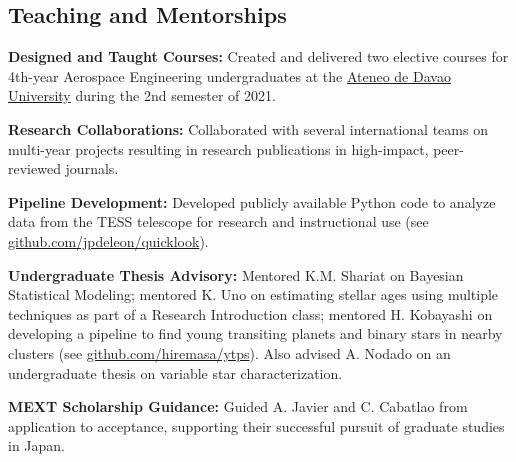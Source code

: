 \documentclass[12pt,letterpaper]{article}
\begin{document}
\subsection{Teaching and Mentorships}
\begin{list}{}{\cvlist}
    \item \textbf{Designed and Taught Courses:} Created and delivered two elective courses for 4th-year Aerospace Engineering undergraduates at the \href{http://sea.addu.edu.ph/programs/aerospace-engineering/}{Ateneo de Davao University} during the 2nd semester of 2021.
    
    \item \textbf{Research Collaborations:} Collaborated with several international teams on multi-year projects resulting in research publications in high-impact, peer-reviewed journals.
    
    \item \textbf{Pipeline Development:} Developed publicly available Python code to analyze data from the TESS telescope for research and instructional use (see \href{https://github.com/jpdeleon/quicklook}{github.com/jpdeleon/quicklook}).
    
    \item \textbf{Undergraduate Thesis Advisory:} Mentored K.M. Shariat on Bayesian Statistical Modeling; mentored K. Uno on estimating stellar ages using multiple techniques as part of a Research Introduction class; mentored H. Kobayashi on developing a pipeline to find young transiting planets and binary stars in nearby clusters (see \href{https://github.com/hiremasa/ytps}{github.com/hiremasa/ytps}). Also advised A. Nodado on an undergraduate thesis on variable star characterization.
    
    \item \textbf{MEXT Scholarship Guidance:} Guided A. Javier and C. Cabatlao from application to acceptance, supporting their successful pursuit of graduate studies in Japan.
\end{list}
\end{document}
